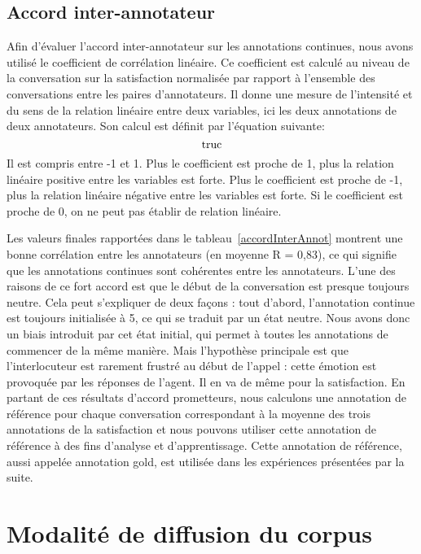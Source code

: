\subsection{Accord inter-annotateur}
Afin d’évaluer l’accord inter-annotateur sur les annotations continues, nous avons utilisé le coefficient de corrélation linéaire. Ce coefficient est calculé au niveau de la conversation sur la satisfaction normalisée par rapport à l’ensemble des conversations entre les paires d’annotateurs.
Il donne une mesure de l'intensité et du sens de la relation linéaire entre deux variables, ici les deux annotations de deux annotateurs. Son calcul est définit par l'équation suivante:
\begin{equation}
  $truc$
\end{equation}
Il est compris entre -1 et 1. Plus le coefficient est proche de 1, plus la relation linéaire positive entre les variables est forte. Plus le coefficient est proche de -1, plus la relation linéaire négative entre les variables est forte. Si le coefficient est proche de 0, on ne peut pas établir de relation linéaire.

Les valeurs finales rapportées dans le tableau~\ref{accordInterAnnot} montrent une bonne corrélation entre les annotateurs (en moyenne R = 0,83), ce qui signifie que les annotations continues sont cohérentes entre les annotateurs.
L’une des raisons de ce fort accord est que le début de la conversation est presque toujours neutre. Cela peut s’expliquer de deux façons : tout d’abord, l’annotation continue est toujours initialisée à 5, ce qui se traduit par un état neutre. Nous avons donc un biais introduit par cet état initial, qui permet à toutes les annotations de commencer de la même manière.
Mais l’hypothèse principale est que l’interlocuteur est rarement frustré au début de l’appel : cette émotion est provoquée par les réponses de l’agent. Il en va de même pour la satisfaction. En partant de ces résultats d’accord prometteurs, nous calculons une annotation de référence pour chaque conversation correspondant à la moyenne des trois annotations de la satisfaction et nous pouvons utiliser cette annotation de référence à des fins d’analyse et d’apprentissage. Cette annotation de référence, aussi appelée annotation gold, est utilisée dans les expériences présentées par la suite.


\section{Modalité de diffusion du corpus}
